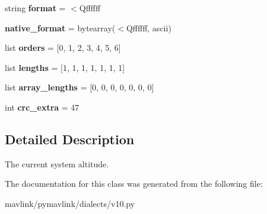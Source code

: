 \begin{DoxyCompactItemize}
string {\bfseries format} = \textquotesingle{}$<$Qffffff\textquotesingle{}
\item 
\mbox{\label{classpymavlink_1_1dialects_1_1v10_1_1MAVLink__altitude__message_a155dde03a9a6fcd9ded40dd9fa6aa714}} 
{\bfseries native\+\_\+format} = bytearray(\textquotesingle{}$<$Qffffff\textquotesingle{}, \textquotesingle{}ascii\textquotesingle{})
\item 
\mbox{\label{classpymavlink_1_1dialects_1_1v10_1_1MAVLink__altitude__message_aa0678446f46e0e892606457c2131babe}} 
list {\bfseries orders} = \mbox{[}0, 1, 2, 3, 4, 5, 6\mbox{]}
\item 
\mbox{\label{classpymavlink_1_1dialects_1_1v10_1_1MAVLink__altitude__message_ac8c1226654ac34b79005b68f7521160d}} 
list {\bfseries lengths} = \mbox{[}1, 1, 1, 1, 1, 1, 1\mbox{]}
\item 
\mbox{\label{classpymavlink_1_1dialects_1_1v10_1_1MAVLink__altitude__message_a60bfc5fc366a33eb6db0667fce1c9591}} 
list {\bfseries array\+\_\+lengths} = \mbox{[}0, 0, 0, 0, 0, 0, 0\mbox{]}
\item 
\mbox{\label{classpymavlink_1_1dialects_1_1v10_1_1MAVLink__altitude__message_a8979b88f39b2de1f298b115566370752}} 
int {\bfseries crc\+\_\+extra} = 47
\end{DoxyCompactItemize}


\subsection{Detailed Description}
\begin{DoxyVerb}The current system altitude.
\end{DoxyVerb}
 

The documentation for this class was generated from the following file\+:\begin{DoxyCompactItemize}
\item 
mavlink/pymavlink/dialects/v10.\+py\end{DoxyCompactItemize}
